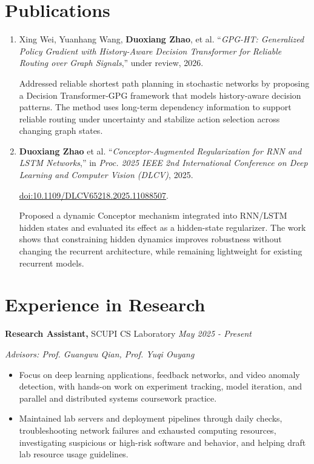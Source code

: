 \documentclass[10pt]{article}
\begin{document}
\section{Publications}
\begin{enumerate}
    \item Xing Wei, Yuanhang Wang, \textbf{Duoxiang Zhao}, et al. ``\textit{GPG-HT: Generalized Policy Gradient with History-Aware Decision Transformer for Reliable Routing over Graph Signals},'' under review, 2026.

    Addressed reliable shortest path planning in stochastic networks by proposing a Decision Transformer-GPG framework that models history-aware decision patterns. The method uses long-term dependency information to support reliable routing under uncertainty and stabilize action selection across changing graph states.

    \item \textbf{Duoxiang Zhao} et al. ``\textit{Conceptor-Augmented Regularization for RNN and LSTM Networks},'' in \textit{Proc. 2025 IEEE 2nd International Conference on Deep Learning and Computer Vision (DLCV)}, 2025.

    \href{https://doi.org/10.1109/DLCV65218.2025.11088507}{doi:10.1109/DLCV65218.2025.11088507}.

    Proposed a dynamic Conceptor mechanism integrated into RNN/LSTM hidden states and evaluated its effect as a hidden-state regularizer. The work shows that constraining hidden dynamics improves robustness without changing the recurrent architecture, while remaining lightweight for existing recurrent models.
\end{enumerate}

\section{Experience in Research}
\textbf{Research Assistant,} SCUPI CS Laboratory \hfill \textit{May 2025 - Present}

\textit{Advisors: Prof. Guangwu Qian, Prof. Yuqi Ouyang}

\begin{itemize}
    \item Focus on deep learning applications, feedback networks, and video anomaly detection, with hands-on work on experiment tracking, model iteration, and parallel and distributed systems coursework practice.
    \item Maintained lab servers and deployment pipelines through daily checks, troubleshooting network failures and exhausted computing resources, investigating suspicious or high-risk software and behavior, and helping draft lab resource usage guidelines.
\end{itemize}
\end{document}
